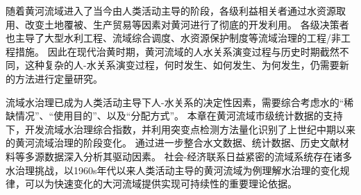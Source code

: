 随着黄河流域进入了当今由人类活动主导的阶段，各级利益相关者通过水资源取用、改变土地覆被、生产贸易等因素对黄河进行了彻底的开发利用。
各级决策者也主导了大型水利工程、流域综合调度、水资源保护制度等流域治理的工程/非工程措施。
因此在现代治黄时期，黄河流域的人水关系演变过程与历史时期截然不同，这种复杂的人-水关系演变过程，何时发生、如何发生、为何发生，仍需要新的方法进行定量研究。

流域水治理已成为人类活动主导下人-水关系的决定性因素，需要综合考虑水的“稀缺情况”、“使用目的”、以及“分配方式”。
本章在黄河流域市级统计数据的支持下，开发流域水治理综合指数，并利用突变点检测方法量化识别了上世纪中期以来的黄河流域治理的阶段变化。
通过进一步整合水文数据、统计数据、历史文献材料等多源数据深入分析其驱动因素。
社会-经济联系日益紧密的流域系统存在诸多水治理挑战，以1960s年代以来人类活动主导的黄河流域为例理解水治理的变化规律，可以为快速变化的大河流域提供实现可持续性的重要理论依据。
